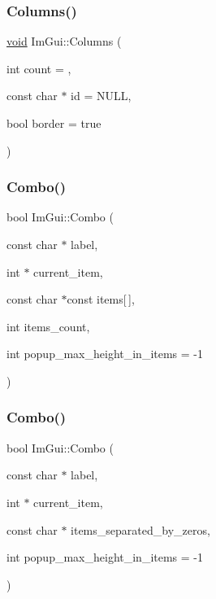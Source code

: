 \mbox{\label{namespaceImGui_a0e2889956542527c4039b6b8bf5c2a38}} 
\subsubsection{\texorpdfstring{Columns()}{Columns()}}
{\footnotesize\ttfamily \hyperlink{imgui__impl__opengl3__loader_8h_ac668e7cffd9e2e9cfee428b9b2f34fa7}{void} Im\+Gui\+::\+Columns (\begin{DoxyParamCaption}\item[{int}]{count = {},  }\item[{const char $\ast$}]{id = {\ttfamily NULL},  }\item[{bool}]{border = {\ttfamily true} }\end{DoxyParamCaption})}

\mbox{\label{namespaceImGui_aa2979368da5b9e98d368449b36d166b2}} 
\subsubsection{\texorpdfstring{Combo()}{Combo()}\hspace{0.1cm}{\footnotesize\ttfamily [1/3]}}
{\footnotesize\ttfamily bool Im\+Gui\+::\+Combo (\begin{DoxyParamCaption}\item[{const char $\ast$}]{label,  }\item[{int $\ast$}]{current\+\_\+item,  }\item[{const char $\ast$const}]{items\mbox{[}$\,$\mbox{]},  }\item[{int}]{items\+\_\+count,  }\item[{int}]{popup\+\_\+max\+\_\+height\+\_\+in\+\_\+items = {\ttfamily -\/1} }\end{DoxyParamCaption})}

\mbox{\label{namespaceImGui_ab982779804105fdc57355868ab531cad}} 
\subsubsection{\texorpdfstring{Combo()}{Combo()}\hspace{0.1cm}{\footnotesize\ttfamily [2/3]}}
{\footnotesize\ttfamily bool Im\+Gui\+::\+Combo (\begin{DoxyParamCaption}\item[{const char $\ast$}]{label,  }\item[{int $\ast$}]{current\+\_\+item,  }\item[{const char $\ast$}]{items\+\_\+separated\+\_\+by\+\_\+zeros,  }\item[{int}]{popup\+\_\+max\+\_\+height\+\_\+in\+\_\+items = {\ttfamily -\/1} }\end{DoxyParamCaption})}

